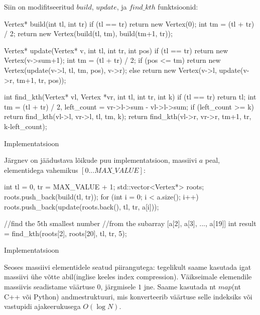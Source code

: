 \documentclass{trkut}
\theoremstyle{definition}
\begin{document}
Siin on modifitseeritud $build$, $update$, ja $find \_ kth$ funktsioonid:
\begin{cclol}
Vertex* build(int tl, int tr) {
    if (tl == tr)
        return new Vertex(0);
    int tm = (tl + tr) / 2;
    return new Vertex(build(tl, tm), build(tm+1, tr));
}

Vertex* update(Vertex* v, int tl, int tr, int pos) {
    if (tl == tr)
        return new Vertex(v->sum+1);
    int tm = (tl + tr) / 2;
    if (pos <= tm)
        return new Vertex(update(v->l, tl, tm, pos), v->r);
    else
        return new Vertex(v->l, update(v->r, tm+1, tr, pos));
}

int find_kth(Vertex* vl, Vertex *vr, int tl, int tr, int k) {
    if (tl == tr)
        return tl;
    int tm = (tl + tr) / 2, left_count = vr->l->sum - vl->l->sum;
    if (left_count >= k)
        return find_kth(vl->l, vr->l, tl, tm, k);
    return find_kth(vl->r, vr->r, tm+1, tr, k-left_count);
}
\end{cclol}
\begin{kk}[H]%
    \caption{Implementatsioon}%
    \label{EMaxx}%
    \end{kk}

Järgnev on jäädustava lõikude puu implementatsioon, massiivi $a$ peal, elementidega vahemikus $[0...MAX \_ VALUE]$:
\begin{cclol}
int tl = 0, tr = MAX_VALUE + 1;
std::vector<Vertex*> roots;
roots.push_back(build(tl, tr));
for (int i = 0; i < a.size(); i++) {
    roots.push_back(update(roots.back(), tl, tr, a[i]));
}

//find the 5th smallest number 
//from the subarray [a[2], a[3], ..., a[19]]
int result = find_kth(roots[2], roots[20], tl, tr, 5);
\end{cclol}
\begin{kk}[H]%
    \caption{Implementatsioon}%
    \label{EMaxx}%
    \end{kk}

Seoses massiivi elementidele seatud piirangutega: tegelikult saame kasutada igat massiivi ühe võtte abil(inglise keeles index compression). Väikseimale elemendile massiivis seadistame väärtuse $0$, järgmisele $1$ jne. Saame kasutada nt $map$(nt C++ või Python) andmestruktuuri, mis konverteerib väärtuse selle indeksiks või vastupidi ajakeerukusega $O(\log N)$.
\end{document}
